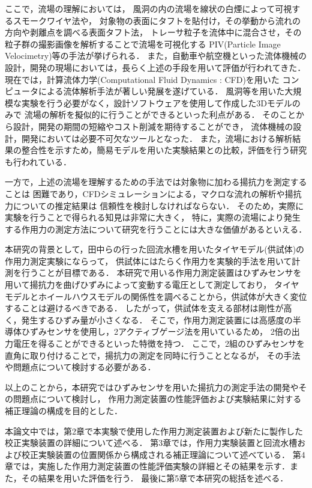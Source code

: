 ここで，流場の理解においては，
風洞の内の流場を線状の白煙によって可視するスモークワイヤ法\cite{1994_smokewire}や，
対象物の表面にタフトを貼付け，その挙動から流れの方向や剥離点を調べる表面タフト法\cite{1994_taft}，
トレーサ粒子を流体中に混合させ，その粒子群の撮影画像を解析することで流場を可視化する
PIV(Particle Image Velocimetry)\cite{1999_PIV}等の手法が挙げられる．
また，自動車や航空機といった流体機械の設計，開発の現場においては，長らく上述の手段を用いて評価が行われてきた．\cite{1974_automobile}
現在では，計算流体力学(Computational Fluid Dynamics : CFD)を用いた
コンピュータによる流体解析手法が著しい発展を遂げている．
風洞等を用いた大規模な実験を行う必要がなく，設計ソフトウェアを使用して作成した3Dモデルのみで
流場の解析を擬似的に行うことができるといった利点がある．
そのことから設計，開発の期間の短縮やコスト削減を期待することができ，
流体機械の設計，開発\cite{2013_aircraft}\cite{1996_ship}においては必要不可欠なツールとなった．
また，流場における解析結果の整合性を示すため，簡易モデルを用いた実験結果との比較，評価を行う研究\cite{2007_CFD_comparison}も行われている．

一方で，上述の流場を理解するための手法では対象物に加わる揚抗力を測定することは
困難であり，CFDシミュレーションによる，マクロな流れの解析や揚抗力についての推定結果は
信頼性を検討しなければならない．\cite{2001_CFD_kobe}
そのため，実際に実験を行うことで得られる知見は非常に大きく，
特に，実際の流場により発生する作用力の測定方法について研究を行うことには大きな価値があるといえる．

本研究の背景として，田中ら\cite{2019_master}の行った回流水槽を用いたタイヤモデル(供試体)の作用力測定実験にならって，
供試体にはたらく作用力を実験的手法を用いて計測を行うことが目標である．
本研究で用いる作用力測定装置はひずみセンサを用いて揚抗力を曲げひずみによって変動する電圧として測定しており，
タイヤモデルとホイールハウスモデルの関係性を調べることから，供試体が大きく変位することは避けるべきである．
したがって，供試体を支える部材は剛性が高く，発生するひずみ量が小さくなる．
そこで，作用力測定装置には高感度の半導体ひずみセンサを使用し，2アクティブゲージ法\cite{2006_strainsensor}を用いているため，
2倍の出力電圧を得ることができるといった特徴を持つ．
ここで，2組のひずみセンサを直角に取り付けることで，揚抗力の測定を同時に行うこととなるが，
その手法や問題点について検討する必要がある．

以上のことから，本研究ではひずみセンサを用いた揚抗力の測定手法の開発やその問題点について検討し，
作用力測定装置の性能評価および実験結果に対する補正理論の構成を目的とした．

本論文中では，第2章で本実験で使用した作用力測定装置および新たに製作した校正実験装置の詳細について述べる．
第3章では，作用力実験装置と回流水槽および校正実験装置の位置関係から構成される補正理論について述べている．
第4章では，実施した作用力測定装置の性能評価実験の詳細とその結果を示す．また，その結果を用いた評価を行う．
最後に第5章で本研究の総括を述べる．
